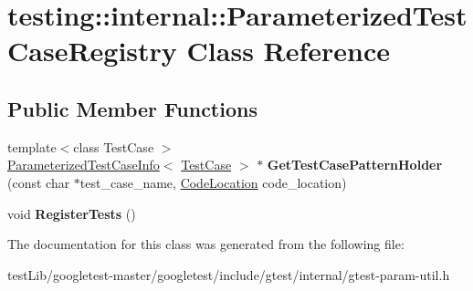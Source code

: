 \hypertarget{classtesting_1_1internal_1_1ParameterizedTestCaseRegistry}{}\section{testing\+:\+:internal\+:\+:Parameterized\+Test\+Case\+Registry Class Reference}
\label{classtesting_1_1internal_1_1ParameterizedTestCaseRegistry}
\subsection*{Public Member Functions}
\begin{DoxyCompactItemize}
\item 
\mbox{\label{classtesting_1_1internal_1_1ParameterizedTestCaseRegistry_af525816aa348f9e33f5d900965991388}} 
{\footnotesize template$<$class Test\+Case $>$ }\\\hyperlink{classtesting_1_1internal_1_1ParameterizedTestCaseInfo}{Parameterized\+Test\+Case\+Info}$<$ \hyperlink{classtesting_1_1TestCase}{Test\+Case} $>$ $\ast$ {\bfseries Get\+Test\+Case\+Pattern\+Holder} (const char $\ast$test\+\_\+case\+\_\+name, \hyperlink{structtesting_1_1internal_1_1CodeLocation}{Code\+Location} code\+\_\+location)
\item 
\mbox{\label{classtesting_1_1internal_1_1ParameterizedTestCaseRegistry_ad5b63c8fe94f3d51d039a76c001c9223}} 
void {\bfseries Register\+Tests} ()
\end{DoxyCompactItemize}


The documentation for this class was generated from the following file\+:\begin{DoxyCompactItemize}
\item 
test\+Lib/googletest-\/master/googletest/include/gtest/internal/gtest-\/param-\/util.\+h\end{DoxyCompactItemize}
